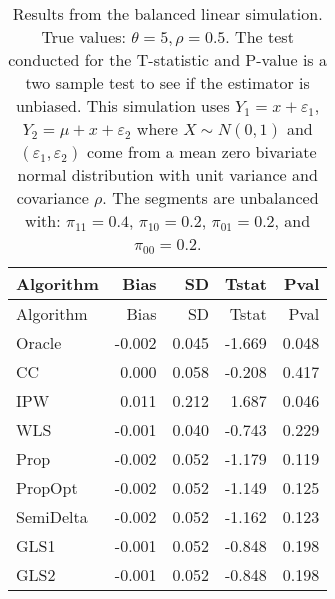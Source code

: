 \documentclass[
  letterpaper,
  DIV=11,
  numbers=noendperiod]{scrartcl}
\begin{document}
\begin{longtable}[]{@{}lrrrr@{}}
\caption{Results from the balanced linear simulation. True values:
\(\theta = 5, \rho = 0.5\). The test conducted for the T-statistic and
P-value is a two sample test to see if the estimator is unbiased. This
simulation uses \(Y_1 = x + \varepsilon_1\),
\(Y_2 = \mu + x + \varepsilon_2\) where \(X \sim N(0, 1)\) and
\((\varepsilon_1, \varepsilon_2)\) come from a mean zero bivariate
normal distribution with unit variance and covariance \(\rho\). The
segments are unbalanced with: \(\pi_{11} = 0.4\), \(\pi_{10} = 0.2\),
\(\pi_{01} = 0.2\), and \(\pi_{00} = 0.2\). }\tabularnewline
\toprule\noalign{}
Algorithm & Bias & SD & Tstat & Pval \\
\midrule\noalign{}
\endfirsthead
\toprule\noalign{}
Algorithm & Bias & SD & Tstat & Pval \\
\midrule\noalign{}
\endhead
\bottomrule\noalign{}
\endlastfoot
Oracle & -0.002 & 0.045 & -1.669 & 0.048 \\
CC & 0.000 & 0.058 & -0.208 & 0.417 \\
IPW & 0.011 & 0.212 & 1.687 & 0.046 \\
WLS & -0.001 & 0.040 & -0.743 & 0.229 \\
Prop & -0.002 & 0.052 & -1.179 & 0.119 \\
PropOpt & -0.002 & 0.052 & -1.149 & 0.125 \\
SemiDelta & -0.002 & 0.052 & -1.162 & 0.123 \\
GLS1 & -0.001 & 0.052 & -0.848 & 0.198 \\
GLS2 & -0.001 & 0.052 & -0.848 & 0.198 \\
\end{longtable}
\end{document}
